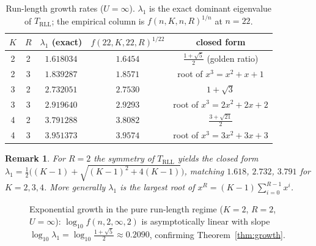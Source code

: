 \documentclass[a4paper,12pt]{article}
\newtheorem{remark}{Remark}
\begin{document}
\begin{table}[H]
\centering
\caption{Run-length growth rates ($U=\infty$). $\lambda_1$ is the
exact dominant eigenvalue of $T_{\mathrm{RLL}}$; the empirical column
is $f(n,K,n,R)^{1/n}$ at $n=22$.}
\label{tab:growth}
\begin{tabular}{ccccc}
\toprule
$K$ & $R$ & $\lambda_1$ (exact) & $f(22,K,22,R)^{1/22}$ & closed form \\
\midrule
2 & 2 & $1.618034$ & $1.6454$ & $\tfrac{1+\sqrt5}{2}$ (golden ratio) \\
2 & 3 & $1.839287$ & $1.8571$ & root of $x^3=x^2+x+1$ \\
3 & 2 & $2.732051$ & $2.7530$ & $1+\sqrt3$ \\
3 & 3 & $2.919640$ & $2.9293$ & root of $x^3=2x^2+2x+2$ \\
4 & 2 & $3.791288$ & $3.8082$ & $\tfrac{3+\sqrt{21}}{2}$ \\
4 & 3 & $3.951373$ & $3.9574$ & root of $x^3=3x^2+3x+3$ \\
\bottomrule
\end{tabular}
\end{table}

\begin{remark}
For $R=2$ the symmetry of $T_{\mathrm{RLL}}$ yields the closed form
$\lambda_1=\tfrac12\bigl((K-1)+\sqrt{(K-1)^2+4(K-1)}\bigr)$, matching
$1.618$, $2.732$, $3.791$ for $K=2,3,4$.  More generally $\lambda_1$
is the largest root of $x^{R}=(K-1)\sum_{i=0}^{R-1}x^{i}$.
\end{remark}

\begin{figure}[H]
\centering
{}
\caption{Exponential growth in the pure run-length regime
($K=2$, $R=2$, $U=\infty$): $\log_{10}f(n,2,\infty,2)$ is
asymptotically linear with slope
$\log_{10}\lambda_1=\log_{10}\tfrac{1+\sqrt5}{2}\approx0.2090$,
confirming Theorem~\ref{thm:growth}.}
\label{fig:growth}
\end{figure}
\end{document}
